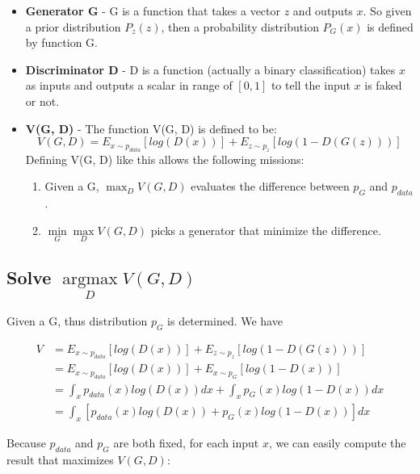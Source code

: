 \documentclass{article} %
\begin{document}
\begin{itemize}
    \item \textbf{Generator G} - G is a function that takes a vector $z$ and outputs $x$. So given a prior distribution $P_{z}(z)$, then a probability distribution $P_{G}(x)$ is defined by function G.
    \item \textbf{Discriminator D} - D is a function (actually a binary classification) takes $x$ as inputs and outputs a scalar in range of $[0, 1]$ to tell the input $x$ is faked or not.
    \item \textbf{V(G, D)} - The function V(G, D) is defined to be:
        \begin{equation}
            V(G, D) = E_{x\sim p_{data}}[log(D(x))]+E_{z\sim p_z}[log(1-D(G(z)))]
        \end{equation}
        Defining V(G, D) like this allows the following missions:
            \begin{enumerate}
                \item Given a G, $\max_{D}V(G,D)$ evaluates the difference between $p_G$ and  $p_{data}$.
                \item $\min \limits_{G} \max \limits_{D}V(G, D)$ picks a generator that minimize the difference.
            \end{enumerate}
\end{itemize}

\subsection{Solve $\mathop{\arg\max} \limits_{D}V(G, D)$}

Given a G, thus distribution $p_{G}$ is determined. We have

\begin{equation}
    \begin{split}
        V & = E_{x\sim p_{data}}[log(D(x))]+E_{z\sim p_z}[log(1-D(G(z)))] \\
          & = E_{x\sim p_{data}}[log(D(x))]+E_{x\sim p_G}[log(1-D(x))] \\
          & = \int_{x}p_{data}(x)log(D(x))dx + \int_{x}p_{G}(x)log(1-D(x))dx \\
          & = \int_{x}[p_{data}(x)log(D(x)) + p_{G}(x)log(1-D(x))]dx
    \end{split}
\end{equation}

Because $p_{data}$ and $p_G$ are both fixed, for each input $x$, we can easily compute the result that maximizes $V(G,D)$:
\end{document}
